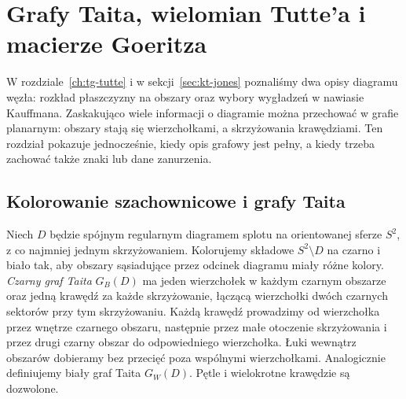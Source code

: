 \chapter{Grafy Taita, wielomian Tutte'a i macierze Goeritza}
\label{ch:tg-tait-goeritz}

W rozdziale~\ref{ch:tg-tutte} i w sekcji~\ref{sec:kt-jones}
poznaliśmy dwa opisy diagramu węzła: rozkład płaszczyzny
na obszary oraz wybory wygładzeń w nawiasie Kauffmana.
Zaskakująco wiele informacji o diagramie można przechować
w grafie planarnym: obszary stają się wierzchołkami,
a skrzyżowania krawędziami. Ten rozdział pokazuje
jednocześnie, kiedy opis grafowy jest pełny, a kiedy
trzeba zachować także znaki lub dane zanurzenia.

\section{Kolorowanie szachownicowe i grafy Taita}
\label{sec:tg-tait-def}

\begin{definicja}
Niech $D$ będzie spójnym regularnym diagramem splotu
na orientowanej sferze $S^2$, z co najmniej jednym
skrzyżowaniem. Kolorujemy składowe $S^2\setminus D$
na czarno i biało tak, aby obszary sąsiadujące przez
odcinek diagramu miały różne kolory. \emph{Czarny graf
Taita} $G_B(D)$ ma jeden wierzchołek w każdym czarnym
obszarze oraz jedną krawędź za każde skrzyżowanie,
łączącą wierzchołki dwóch czarnych sektorów przy tym
skrzyżowaniu. Każdą krawędź prowadzimy od wierzchołka
przez wnętrze czarnego obszaru, następnie przez małe
otoczenie skrzyżowania i przez drugi czarny obszar
do odpowiedniego wierzchołka. Łuki wewnątrz obszarów
dobieramy bez przecięć poza wspólnymi wierzchołkami.
Analogicznie definiujemy biały graf Taita $G_W(D)$.
Pętle i wielokrotne krawędzie są dozwolone.
\end{definicja}

